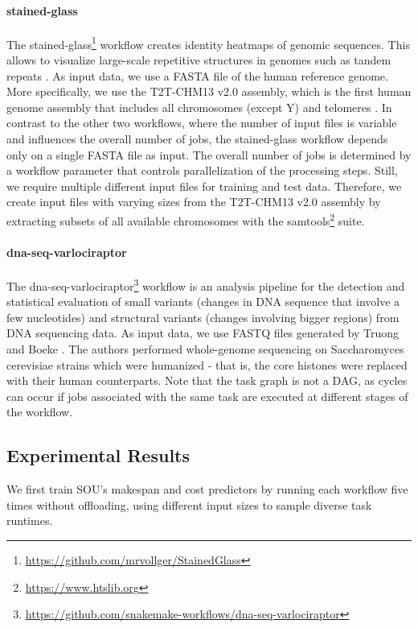 \paragraph{stained-glass}
The stained-glass\footnote{\url{https://github.com/mrvollger/StainedGlass}} workflow creates identity heatmaps of genomic sequences.
This allows to visualize large-scale repetitive structures in genomes such as tandem repeats \cite{vollger_stainedglass_2022}.
As input data, we use a FASTA file of the human reference genome.
More specifically, we use the T2T-CHM13 v2.0 assembly, which is the first human genome assembly that includes all chromosomes (except Y) and telomeres \cite{nurk_complete_2022}.
In contrast to the other two workflows, where the number of input files is variable and influences the overall number of jobs, the stained-glass workflow depends only on a single FASTA file as input.
The overall number of jobs is determined by a workflow parameter that controls parallelization of the processing steps.
Still, we require multiple different input files for training and test data.
Therefore, we create input files with varying sizes from the T2T-CHM13 v2.0 assembly by extracting subsets of all available chromosomes with the samtools\footnote{\url{https://www.htslib.org}} suite.

\paragraph{dna-seq-varlociraptor}
The dna-seq-varlociraptor\footnote{\url{https://github.com/snakemake-workflows/dna-seq-varlociraptor}} workflow is an analysis pipeline for the detection and statistical evaluation of small variants (changes in  DNA sequence that involve a few nucleotides) and structural variants (changes involving bigger regions) from DNA sequencing data.
As input data, we use FASTQ files generated by Truong and Boeke \cite{truong_resetting_2017}.
The authors performed whole-genome sequencing on Saccharomyces cerevisiae strains which were humanized - that is, the core histones were replaced with their human counterparts.
Note that the task graph is not a DAG, as cycles can occur if jobs associated with the same task are executed at different stages of the workflow.

\subsection{Experimental Results}

We first train SOU’s makespan and cost predictors by running each workflow five times without offloading, using different input sizes to sample diverse task runtimes.

